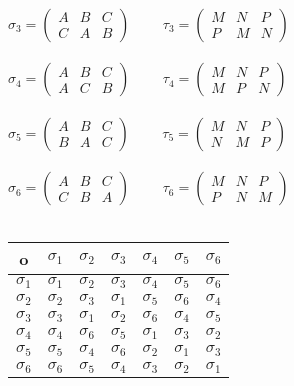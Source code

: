 \\
$\sigma_3=\begin{pmatrix}
A & B & C\\
C & A & B
\end{pmatrix}$
$\qquad\tau_3=\begin{pmatrix}
M & N & P\\
P & M & N
\end{pmatrix}$\\
\\
$\sigma_4=\begin{pmatrix}
A & B & C\\
A & C & B
\end{pmatrix}$
$\qquad\tau_4=\begin{pmatrix}
M & N & P\\
M & P & N
\end{pmatrix}$\\
\\
$\sigma_5=\begin{pmatrix}
A & B & C\\
B & A & C
\end{pmatrix}$
$\qquad\tau_5=\begin{pmatrix}
M & N & P\\
N & M & P
\end{pmatrix}$\\
\\
$\sigma_6=\begin{pmatrix}
A & B & C\\
C & B & A
\end{pmatrix}$
$\qquad\tau_6=\begin{pmatrix}
M & N & P\\
P & N & M
\end{pmatrix}$\\
\\
\begin{center}
	\begin{tabular}{c| c c c c c c}
		o & $\sigma_1$ & $\sigma_2$ & $\sigma_3$ & $\sigma_4$ & $\sigma_5$ & $\sigma_6$\\
		\hline
		$\sigma_1$ & $\sigma_1$ & $\sigma_2$ & $\sigma_3$ & $\sigma_4$ & $\sigma_5$ & $\sigma_6$\\
		$\sigma_2$ & $\sigma_2$ & $\sigma_3$ & $\sigma_1$ & $\sigma_5$ & $\sigma_6$ & $\sigma_4$\\
		$\sigma_3$ & $\sigma_3$ & $\sigma_1$ & $\sigma_2$ & $\sigma_6$ & $\sigma_4$ & $\sigma_5$\\
		$\sigma_4$ & $\sigma_4$ & $\sigma_6$ & $\sigma_5$ & $\sigma_1$ & $\sigma_3$ & $\sigma_2$\\
		$\sigma_5$ & $\sigma_5$ & $\sigma_4$ & $\sigma_6$ & $\sigma_2$ & $\sigma_1$ & $\sigma_3$\\
		$\sigma_6$ & $\sigma_6$ & $\sigma_5$ & $\sigma_4$ & $\sigma_3$ & $\sigma_2$ & $\sigma_1$\\
	\end{tabular}
\end{center}
